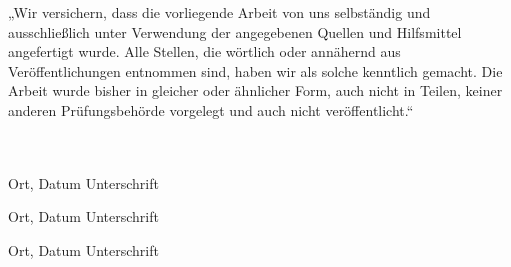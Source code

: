 \documentclass[12pt,toc=bib,toc=listof]{scrreprt}
\newcommand{\studentnameA}{Suphi Pembe}
\newcommand{\studentpartA}{SEITEN oder KAPITEL VON BIS 1}
\newcommand{\studentnameB}{Andreas Würzer}
\newcommand{\studentpartB}{SEITEN oder KAPITEL VON BIS 2}
\newcommand{\studentnameC}{Christian Nguyen}
\newcommand{\studentpartC}{SEITEN oder KAPITEL VON BIS 3}
\newcounter{savepage}
\begin{document}

\appendix
\newpage

\setcounter{page}{\thesavepage}



\newpage

\printbibliography[heading=head]



\newpage

\label{sec:erklaerung}

„Wir versichern, dass die vorliegende Arbeit von uns selbständig und ausschließlich unter Verwendung der angegebenen Quellen und Hilfsmittel angefertigt wurde. Alle Stellen, die wörtlich oder annähernd aus Veröffentlichungen entnommen sind, haben wir als solche kenntlich gemacht. Die Arbeit wurde bisher in gleicher oder ähnlicher Form, auch nicht in Teilen, keiner anderen Prüfungsbehörde vorgelegt und auch nicht veröffentlicht.“

\vspace{1cm}
\noindent
\\
\\

\vspace{3cm}
Ort, Datum \hfill Unterschrift

\vspace{2cm}
Ort, Datum \hfill Unterschrift

\vspace{2cm}
Ort, Datum \hfill Unterschrift
\end{document}
